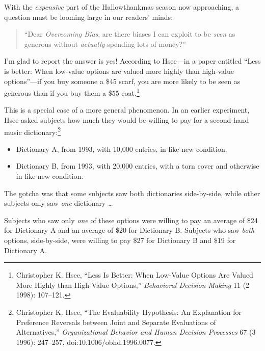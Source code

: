 \myendsectiontext


\bigskip


{
 With the \textit{expensive} part of the Hallowthankmas season now
approaching, a question must be looming large in our
readers' minds:}

\begin{quote}
{
 ``Dear \textit{Overcoming Bias}, are there biases
I can exploit to be \textit{seen} as generous without \textit{actually}
spending lots of money?''}
\end{quote}

{
 I'm glad to report the answer is yes! According to
Hsee---in a paper entitled ``Less is better: When
low-value options are valued more highly than high-value
options''---if you buy someone a \$45 scarf, you are
more likely to be seen as generous than if you buy them a \$55
coat.\footnote{Christopher K. Hsee, ``Less Is Better: When
Low-Value Options Are Valued More Highly than High-Value
Options,'' \textit{Behavioral Decision Making} 11 (2
1998): 107--121.}}

{
 This is a special case of a more general phenomenon. In an earlier
experiment, Hsee asked subjects how much they would be willing to pay
for a second-hand music dictionary:\footnote{Christopher K. Hsee, ``The Evaluability
Hypothesis: An Explanation for Preference Reversals between Joint and
Separate Evaluations of Alternatives,''
\textit{Organizational Behavior and Human Decision Processes} 67 (3
1996): 247--257, doi:10.1006/obhd.1996.0077.}}

\begin{itemize}
\item {
 Dictionary A, from 1993, with 10,000 entries, in like-new
condition.}

\item {
 Dictionary B, from 1993, with 20,000 entries, with a torn cover
 and otherwise in like-new condition.}
\end{itemize}

{
 The gotcha was that some subjects saw both dictionaries
side-by-side, while other subjects only saw \textit{one} dictionary
\ldots}

{
 Subjects who saw only \textit{one} of these options were willing
to pay an average of \$24 for Dictionary A and an average of \$20 for
Dictionary B. Subjects who saw \textit{both} options, side-by-side,
were willing to pay \$27 for Dictionary B and \$19 for Dictionary A.}

